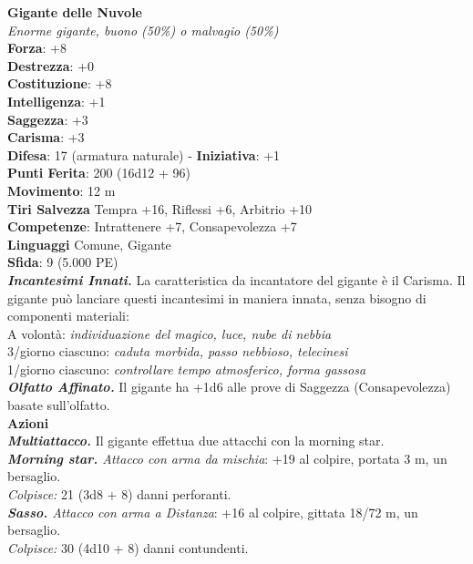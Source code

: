 \begin{multicols}{2}
\medskip\textbf{Gigante delle Nuvole}\\
\emph{Enorme gigante, buono (50\%) o malvagio (50\%)}\\
\textbf{Forza}: +8 \\
\textbf{Destrezza}: +0\\
\textbf{Costituzione}: +8\\
\textbf{Intelligenza}: +1\\
\textbf{Saggezza}: +3\\
\textbf{Carisma}: +3\\
\textbf{Difesa}: 17 (armatura naturale) - \textbf{Iniziativa}: +1\\
\textbf{Punti Ferita}: 200 (16d12 + 96)\\
\textbf{Movimento}: 12 m\\
\textbf{Tiri Salvezza} Tempra +16, Riflessi +6, Arbitrio +10\\
\textbf{Competenze}: Intrattenere +7, Consapevolezza +7\\
\textbf{Linguaggi} Comune, Gigante\\
\textbf{Sfida}: 9 (5.000 PE)\smallskip\\
\emph{\textbf{Incantesimi Innati.}} La caratteristica da incantatore del gigante è il Carisma. Il gigante può lanciare questi incantesimi in maniera innata, senza bisogno di componenti materiali:\\
A volontà: \emph{individuazione del magico, luce, nube di nebbia}\\
3/giorno ciascuno: \emph{caduta morbida, passo nebbioso, telecinesi}\\
1/giorno ciascuno: \emph{controllare tempo atmosferico, forma gassosa}\\
\emph{\textbf{Olfatto Affinato.}} Il gigante ha +1d6 alle prove di Saggezza (Consapevolezza) basate sull'olfatto.\\
\smallskip\textbf{Azioni}\\
\emph{\textbf{Multiattacco.}} Il gigante effettua due attacchi con la morning star.\\
\emph{\textbf{Morning star.} Attacco con arma da mischia}: +19 al colpire, portata 3 m, un bersaglio.\\
\emph{Colpisce:} 21 (3d8 + 8) danni perforanti.\\
\emph{\textbf{Sasso.} Attacco con arma a Distanza}: +16 al colpire, gittata 18/72 m, un bersaglio.\\
\emph{Colpisce:} 30 (4d10 + 8) danni contundenti.\\

\end{multicols}
